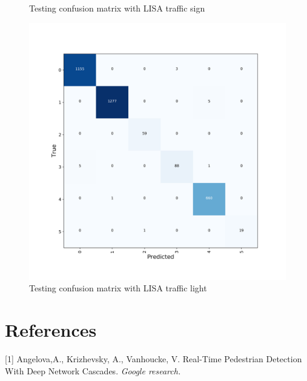 \documentclass{article}
\begin{document}
\begin{figure}
\begin{minipage}{.5\textwidth}
    \centering
    \caption{Testing confusion matrix with LISA traffic sign}
    \label{fig:fig_12}
  \end{minipage}
  \begin{minipage}{.5\textwidth}
    \includegraphics[width=1.0\linewidth]{confusion_matrix_traffic_light.png}
    \centering
    \caption{Testing confusion matrix with LISA traffic light}
    \label{fig:fig_13}
  \end{minipage}
\end{figure}

\section*{References}

\medskip

\small

[1] Angelova,A., Krizhevsky, A., Vanhoucke, V. Real-Time Pedestrian Detection With Deep Network Cascades. {\it Google research.}
\end{document}
